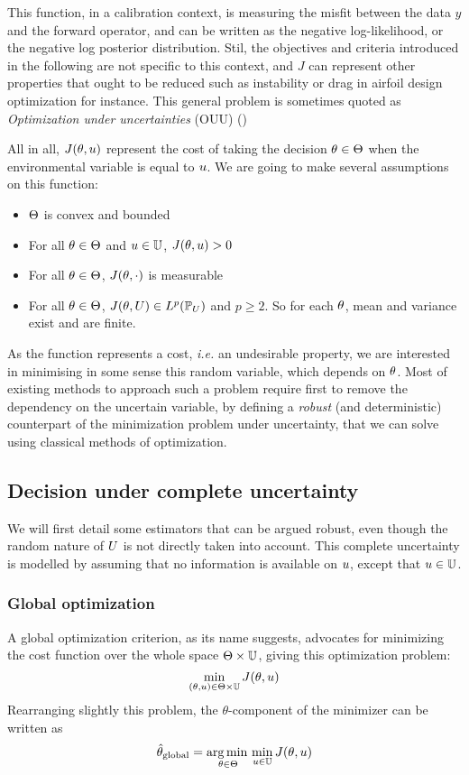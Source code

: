 \documentclass[../../Main_ManuscritThese.tex]{subfiles}
\begin{document}
This function, in a calibration context, is measuring the misfit between the data $y$ and the forward operator, and can be written as the negative log-likelihood, or the negative log posterior distribution. Stil, the objectives and criteria introduced in the following are not specific to this context, and $J$ can represent other properties that ought to be reduced such as instability or drag in airfoil design optimization for instance. This general problem is sometimes quoted as \emph{Optimization under uncertainties} (OUU) (\cite{cook_effective_2018,seshadri_density-matching_2014})


All in all, $J(\theta, u)$ represent the cost of taking the decision $\theta\in\Theta$ when the environmental variable is equal to $u$.
We are going to make several assumptions on this function:
\begin{itemize}
\item $\Theta$ is convex and bounded 
\item For all $\theta \in \Theta$ and $u \in \mathbb{U}$, $J(\theta, u)>0$
\item For all $\theta \in \Theta$, $J(\theta, \cdot)$ is measurable
\item For all $\theta \in \Theta$, $J(\theta, U) \in L^p(\mathbb{P}_{U})$ and $p \geq 2$. So for each $\theta$, mean and variance exist and are finite.
\end{itemize}

As the function represents a cost, \emph{i.e.} an undesirable property, we are interested in minimising in some sense this random variable, which depends on $\theta$.
Most of existing methods to approach such a problem require first to remove the dependency on the uncertain variable, by defining a \emph{robust} (and deterministic) counterpart of the minimization problem under uncertainty, that we can solve using classical methods of optimization.

\subsection{Decision under complete uncertainty}
We will first detail some estimators that can be argued robust, even though the random nature of $U$ is not directly taken into account.
This complete uncertainty is modelled by assuming that no information is available on $u$, except that $u \in \mathbb{U}$.

\subsubsection{Global optimization}
A global optimization criterion, as its name suggests, advocates for minimizing the cost function over the whole space $\Theta \times \mathbb{U}$, giving this optimization problem:
\begin{equation}
  \min_{(\theta,u) \in \Theta \times \mathbb{U}} J(\theta, u)
\end{equation}
Rearranging slightly this problem, the $\theta$-component of the minimizer can be written as
\begin{equation}
  \label{eq:kkglobal}
  \hat{\theta}_{\mathrm{global}} = \operatorname*{arg\,min \,}_{\theta \in \Theta} \min_{u \in \mathbb{U}} J(\theta, u)
\end{equation}
\end{document}
